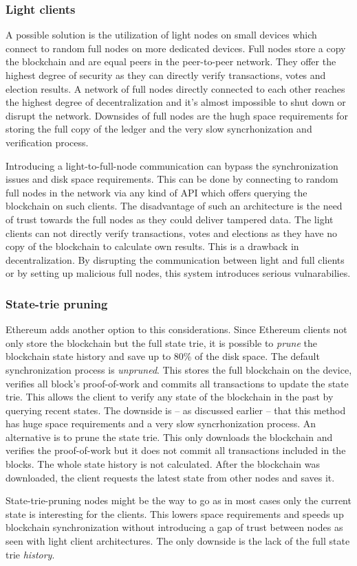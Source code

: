 \documentclass[9pt,oneside]{amsart}
\begin{document}
\begin{multicols}{2}
\subsubsection{Light clients} %
A possible solution is the utilization of light nodes on small devices which connect to random full nodes on more dedicated devices. Full nodes store a copy the blockchain and are equal peers in the peer-to-peer network. They offer the highest degree of security as they can directly verify transactions, votes and election results. A network of full nodes directly connected to each other reaches the highest degree of decentralization and it's almost impossible to shut down or disrupt the network. Downsides of full nodes are the hugh space requirements for storing the full copy of the ledger and the very slow syncrhonization and verification process.\par
Introducing a light-to-full-node communication can bypass the synchronization issues and disk space requirements. This can be done by connecting to random full nodes in the network via any kind of API which offers querying the blockchain on such clients. The disadvantage of such an architecture is the need of trust towards the full nodes as they could deliver tampered data. The light clients can not directly verify transactions, votes and elections as they have no copy of the blockchain to calculate own results. This is a drawback in decentralization. By disrupting the communication between light and full clients or by setting up malicious full nodes, this system introduces serious vulnarabilies.
\subsubsection{State-trie pruning}
Ethereum adds another option to this considerations. Since Ethereum clients not only store the blockchain but the full state trie, it is possible to \textit{prune} the blockchain state history and save up to 80\% of the disk space. The default synchronization process is \textit{unpruned}. This stores the full blockchain on the device, verifies all block's proof-of-work and commits all transactions to update the state trie. This allows the client to verify any state of the blockchain in the past by querying recent states. The downside is -- as discussed earlier -- that this method has huge space requirements and a very slow syncrhonization process. An alternative is to prune the state trie. This only downloads the blockchain and verifies the proof-of-work but it does not commit all transactions included in the blocks. The whole state history is not calculated. After the blockchain was downloaded, the client requests the latest state from other nodes and saves it.\par
State-trie-pruning nodes might be the way to go as in most cases only the current state is interesting for the clients. This lowers space requirements and speeds up blockchain synchronization without introducing a gap of trust between nodes as seen with light client architectures. The only downside is the lack of the full state trie \textit{history}.


\end{multicols}
\end{document}
